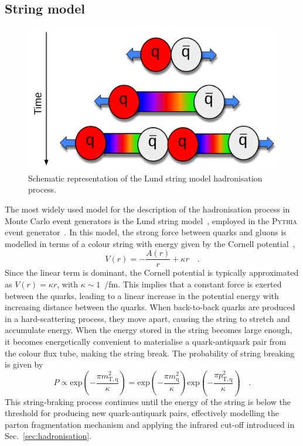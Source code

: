 \subsection{String model}
\begin{figure}[htb]
    \centering
    \includegraphics[width=0.7\linewidth]{Figures/Chapter 2/Lund.png}
    \caption{Schematic representation of the Lund string model hadronisation process.}
    \label{fig:Lund}
\end{figure}
The most widely used model for the description of the hadronisation process in Monte Carlo event generators is the Lund string model~\cite{Andersson:1983ia}, employed in the \textsc{Pythia} event generator~\cite{Bierlich:2022pfr}. In this model, the strong force between quarks and gluons is modelled in terms of a colour string with energy given by the Cornell potential~\cite{Eichten:1974af},
\begin{equation*}
    V(r) = -\frac{A(r)}{r} + \kappa r\quad .
\end{equation*}
Since the linear term is dominant, the Cornell potential is typically approximated as $V(r) = \kappa r$, with $\kappa\sim1$~\gev/fm. This implies that a constant force is exerted between the quarks, leading to a linear increase in the potential energy with increasing distance between the quarks. When back-to-back quarks are produced in a hard-scattering process, they move apart, causing the string to stretch and accumulate energy. When the energy stored in the string becomes large enough, it becomes energetically convenient to materialise a quark-antiquark pair from the colour flux tube, making the string break. The probability of string breaking is given by~\cite{Andersson:1983jt}
\begin{equation}\label{eq:P_string_breaking}
    P \propto \mathrm{exp}\left(-\frac{\pi m_\mathrm{T,q}^2}{\kappa}\right) = \mathrm{exp}\left(-\frac{\pi m_\mathrm{q}^2}{\kappa}\right) \mathrm{exp}\left(-\frac{\pi p_\mathrm{T,q}^2}{\kappa}\right)\quad .
\end{equation}
This string-braking process continues until the energy of the string is below the threshold for producing new quark-antiquark pairs, effectively modelling the parton fragmentation mechanism and applying the infrared cut-off introduced in Sec.~\ref{sec:hadronisation}.


